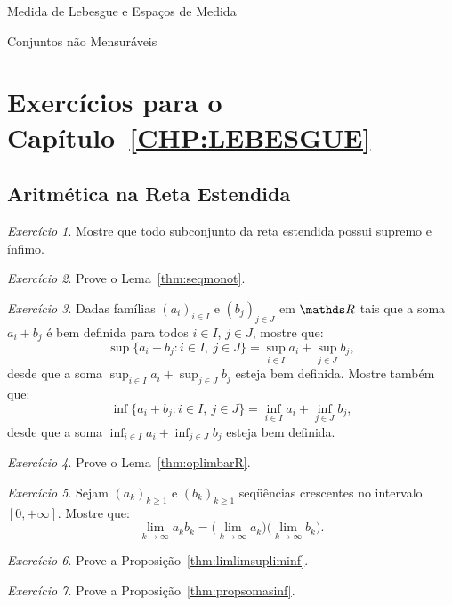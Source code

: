 \documentclass[oneside,final,11pt]{amsbook}
\newcommand{\R}{\mathds R}
\theoremstyle{remark}\newtheorem{exercise}{Exercício}[chapter]
\theoremstyle{remark}\newtheorem{*exercise}[exercise]{\hbox to 0pt{\hskip 0pt minus 1fil*}Exercício}
\theoremstyle{definition}\newtheorem{exdefin}{Definição}[chapter]
\theoremstyle{plain}\newtheorem{teo}{Teorema}[section]
\theoremstyle{plain}\newtheorem{lem}[teo]{Lema}
\theoremstyle{plain}\newtheorem{prop}[teo]{Proposição}
\theoremstyle{plain}\newtheorem{cor}[teo]{Corolário}
\theoremstyle{definition}\newtheorem{defin}[teo]{Definição}
\theoremstyle{remark}\newtheorem{rem}[teo]{Observação}
\theoremstyle{definition}\newtheorem{notation}[teo]{Notação}
\theoremstyle{definition}\newtheorem{convention}[teo]{Convenção}
\theoremstyle{definition}\newtheorem{example}[teo]{Exemplo}
\numberwithin{section}{chapter}
\numberwithin{equation}{section}
\begin{document}
\begin{chapter}{Medida de Lebesgue e Espaços de Medida}
\begin{section}{Conjuntos não Mensuráveis}
\end{section}

\section*{Exercícios para o Capítulo~\ref{CHP:LEBESGUE}}

\subsection*{Aritmética na Reta Estendida}

\begin{exercise}\label{exe:supinf}
Mostre que todo subconjunto da reta estendida possui supremo e ínfimo.
\end{exercise}

\begin{exercise}\label{exe:seqmonot}
Prove o Lema~\ref{thm:seqmonot}.
\end{exercise}

\begin{exercise}
Dadas famílias $(a_i)_{i\in I}$ e $(b_j)_{j\in J}$ em $\overline\R$ tais que a soma
$a_i+b_j$ é bem definida para todos $i\in I$, $j\in J$, mostre que:
\[\sup\big\{a_i+b_j:i\in I,\ j\in J\big\}=\sup_{i\in I}a_i+\sup_{j\in J}b_j,\]
desde que a soma $\sup_{i\in I}a_i+\sup_{j\in J}b_j$ esteja bem
definida. Mostre também que:
\[\inf\big\{a_i+b_j:i\in I,\ j\in J\big\}=\inf_{i\in I}a_i+\inf_{j\in J}b_j,\]
desde que a soma $\inf_{i\in I}a_i+\inf_{j\in J}b_j$ esteja bem definida.
\end{exercise}

\begin{exercise}\label{exe:oplimbarR}
Prove o Lema~\ref{thm:oplimbarR}.
\end{exercise}

\begin{exercise}\label{exe:prodcresseq}
Sejam $(a_k)_{k\ge1}$ e $(b_k)_{k\ge1}$ seqüências crescentes no intervalo $[0,+\infty]$.
Mostre que:
\[\lim_{k\to\infty}a_kb_k=\big(\lim_{k\to\infty}a_k\big)\big(\lim_{k\to\infty}b_k\big).\]
\end{exercise}

\begin{exercise}\label{exe:liminflimsup}
Prove a Proposição~\ref{thm:limlimsupliminf}.
\end{exercise}

\begin{exercise}\label{exe:propsomasinf}
	Prove a Proposição~\ref{thm:propsomasinf}.
\end{exercise}


\end{chapter}
\end{document}
